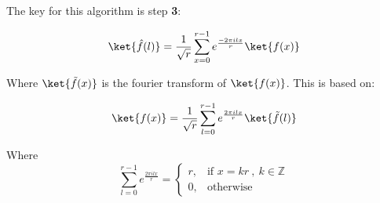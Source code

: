 The key for this algorithm is step \textbf{3}:

\begin{equation*}
    \ket{\hat{f}(l)} = \frac{1}{\sqrt{r}} \sum_{x=0}^{r-1} e^{\frac{-2 \pi i l x}{r}} \ket{f(x)}
\end{equation*}

Where $\ket{\Tilde{f}(x)}$ is the fourier transform of $\ket{f(x)}$. This is based on:

\begin{equation*}
    \ket{f(x)} = \frac{1}{\sqrt{r}} \sum_{l=0}^{r-1} e^{\frac{2 \pi i l x}{r}} \ket{\Tilde{f}(l)}
\end{equation*}

Where 
\begin{equation*}
    \sum_{l=0}^{r-1} e^{\frac{2 \pi i l x}{r}} = \begin{cases}
    r,& \text{if } x= kr \ , \ k \in \mathbb{Z}\\
    0,              & \text{otherwise}
\end{cases}
\end{equation*}